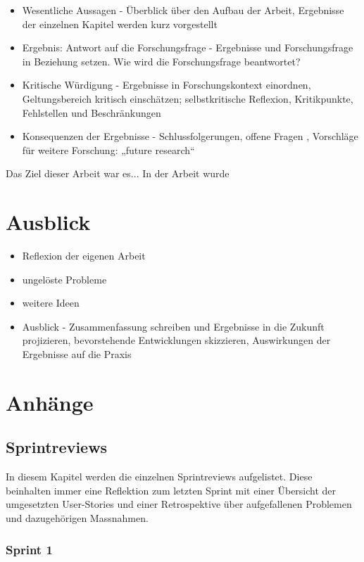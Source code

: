 \documentclass[a4paper, table]{article}
\begin{document}
\begin{itemize}
    \item Wesentliche Aussagen - Überblick über den Aufbau der Arbeit, Ergebnisse der einzelnen Kapitel werden kurz vorgestellt 
    \item Ergebnis: Antwort auf die Forschungsfrage - Ergebnisse und Forschungsfrage in Beziehung setzen. Wie wird die Forschungsfrage beantwortet?
    \item Kritische Würdigung - Ergebnisse in Forschungskontext einordnen, Geltungsbereich kritisch einschätzen; selbstkritische Reflexion, Kritikpunkte, Fehlstellen und Beschränkungen 
    \item Konsequenzen der Ergebnisse - Schlussfolgerungen, offene Fragen , Vorschläge für weitere Forschung: „future research“
\end{itemize}

Das Ziel dieser Arbeit war es... 
In der Arbeit wurde 

\newpage
\section{Ausblick}
\begin{itemize}
    \item Reflexion der eigenen Arbeit
    \item ungelöste Probleme
    \item weitere Ideen
    \item Ausblick - Zusammenfassung schreiben und Ergebnisse in die Zukunft projizieren, bevorstehende Entwicklungen skizzieren, Auswirkungen der Ergebnisse auf die Praxis
\end{itemize}


\newpage

\section{Anh\"ange}

\subsection{Sprintreviews}\label{Sprintreviews}
In diesem Kapitel werden die einzelnen Sprintreviews aufgelistet.
Diese beinhalten immer eine Reflektion zum letzten Sprint mit einer Übersicht der umgesetzten User-Stories und
einer Retrospektive über aufgefallenen Problemen und dazugehörigen Massnahmen.

\subsubsection{Sprint 1}
\end{document}
